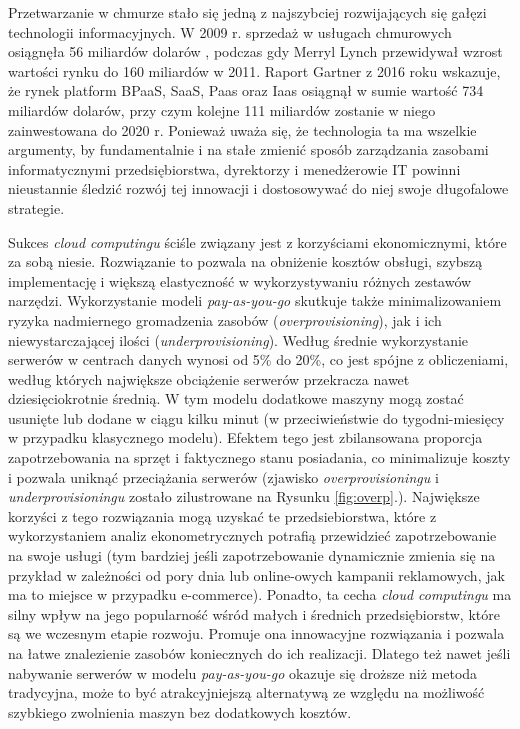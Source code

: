 \documentclass[12pt,a4paper,twoside]{article}
\begin{document}
\noindent
Przetwarzanie w chmurze stało się jedną z najszybciej rozwijających się gałęzi technologii informacyjnych. W 2009 r. sprzedaż w usługach chmurowych osiągnęła 56 miliardów dolarów \citep{smith2009}, podczas gdy Merryl Lynch przewidywał wzrost wartości rynku do 160 miliardów w 2011. Raport Gartner z 2016 roku \citep{anderson2016} wskazuje, że rynek platform BPaaS, SaaS, Paas oraz Iaas osiągnął w sumie wartość 734 miliardów dolarów, przy czym kolejne 111 miliardów zostanie w niego zainwestowana do 2020 r. Ponieważ uważa się, że technologia ta ma wszelkie argumenty, by fundamentalnie i na stałe zmienić sposób zarządzania zasobami informatycznymi przedsiębiorstwa, dyrektorzy i menedżerowie IT powinni nieustannie śledzić rozwój tej innowacji i dostosowywać do niej swoje długofalowe strategie.

Sukces \textit{cloud computingu} ściśle związany jest z korzyściami ekonomicznymi, które za sobą niesie. Rozwiązanie to pozwala na obniżenie kosztów obsługi, szybszą implementację i większą elastyczność w wykorzystywaniu różnych zestawów narzędzi. Wykorzystanie modeli \textit{pay-as-you-go} skutkuje także minimalizowaniem ryzyka nadmiernego gromadzenia zasobów (\textit{overprovisioning}), jak i ich niewystarczającej ilości (\textit{underprovisioning}). Według \citet{armburst2010} średnie wykorzystanie serwerów w centrach danych wynosi od 5\% do 20\%, co jest spójne z obliczeniami, według których największe obciążenie serwerów przekracza nawet dziesięciokrotnie średnią.  W tym modelu dodatkowe maszyny mogą zostać usunięte lub dodane w ciągu kilku minut (w przeciwieństwie do tygodni-miesięcy w przypadku klasycznego modelu). Efektem tego jest zbilansowana proporcja zapotrzebowania na sprzęt i faktycznego stanu posiadania, co minimalizuje koszty i pozwala uniknąć przeciążania serwerów (zjawisko \textit{overprovisioningu} i \textit{underprovisioningu} zostało zilustrowane na Rysunku \ref{fig:overp}.). Największe korzyści z tego rozwiązania mogą uzyskać te przedsiebiorstwa, które z wykorzystaniem analiz ekonometrycznych potrafią przewidzieć zapotrzebowanie na swoje usługi (tym bardziej jeśli zapotrzebowanie dynamicznie zmienia się na przykład w zależności od pory dnia lub online-owych kampanii reklamowych, jak ma to miejsce w przypadku e-commerce). Ponadto, ta cecha \textit{cloud computingu} ma silny wpływ na jego popularność wśród małych i średnich przedsiębiorstw, które są we wczesnym etapie rozwoju. Promuje ona innowacyjne rozwiązania i pozwala na łatwe znalezienie zasobów koniecznych do ich realizacji. Dlatego też nawet jeśli nabywanie serwerów w modelu \textit{pay-as-you-go} okazuje się droższe niż metoda tradycyjna, może to być atrakcyjniejszą alternatywą ze względu na możliwość szybkiego zwolnienia maszyn bez dodatkowych kosztów.
\end{document}

